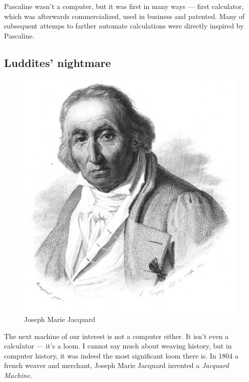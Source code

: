 \documentclass[../../what-is-computer]{subfiles}
\begin{document}
    Pascaline wasn't a computer, but it was first in many ways --- first calculator, which was afterwards commercialized, used in business and patented. Many of 
    subsequent attemps to farther automate calculations were directly inspired by Pascaline. \par

    \subsection{Luddites' nightmare}

    \begin{figure}
        \centering
        \includegraphics[scale=0.2]{images/persons/person_joseph_jacquard.jpg}
        \caption{Joseph Marie Jacquard}
    \end{figure}

    The next machine of our interest is not a computer either. It isn't even a calculator --- it's a loom. I cannot say much about weaving history, 
    but in computer history, it was indeed the most significant loom there is. In 1804 a french weaver and merchant, Joseph Marie Jacquard invented a \emph{Jacquard Machine}. \par
\end{document}
